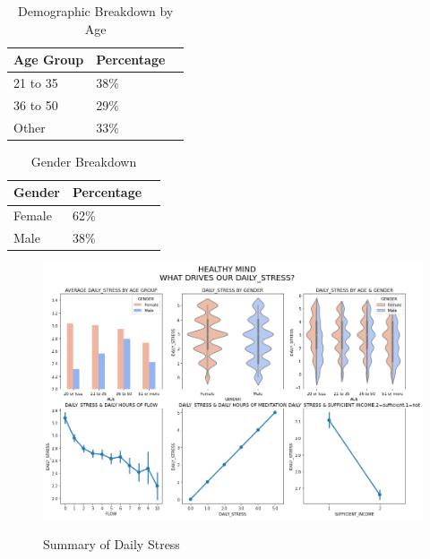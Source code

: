 \documentclass[runningheads]{llncs}
\begin{document}
\begin{enumerate}
\begin{table}[ht]
    \centering
    \caption{Demographic Breakdown by Age}\label{tab1}
    \begin{tabular}{|l|l|l|}
        \hline
        \textbf{Age Group} & \textbf{Percentage} \\ 
        \hline
        21 to 35 & 38\% \\ 
        36 to 50 & 29\% \\ 
        Other & 33\% \\ 
        \hline
    \end{tabular}
\end{table}


\begin{table}[h]
    \centering
    \caption{Gender Breakdown}\label{tab1}
    \begin{tabular}{|l|l|l|}
        \hline
        \textbf{Gender} & \textbf{Percentage} \\ 
        \hline
        Female & 62\% \\ 
        Male & 38\% \\ 
        \hline
    \end{tabular}
\end{table}
\clearpage
\begin{figure}
    \centering
    \includegraphics[width=1.2\linewidth]{__results___16_0.png}
    \caption{Summary of Daily Stress}\cite{Work-Life}
    \label{fig:enter-label}
\end{figure}


\end{enumerate}
\end{document}

